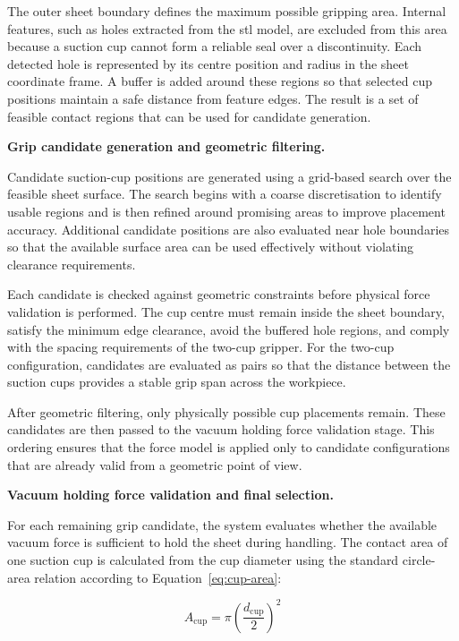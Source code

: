The outer sheet boundary defines the maximum possible gripping area. Internal features, such as holes extracted from the \ac{stl} model, are excluded from this area because a suction cup cannot form a reliable seal over a discontinuity. Each detected hole is represented by its centre position and radius in the sheet coordinate frame. A buffer is added around these regions so that selected cup positions maintain a safe distance from feature edges. The result is a set of feasible contact regions that can be used for candidate generation.

\label{subsec:grip-candidate-search}
\noindent\textbf{Grip candidate generation and geometric filtering.}

Candidate suction-cup positions are generated using a grid-based search over the feasible sheet surface. The search begins with a coarse discretisation to identify usable regions and is then refined around promising areas to improve placement accuracy. Additional candidate positions are also evaluated near hole boundaries so that the available surface area can be used effectively without violating clearance requirements.

Each candidate is checked against geometric constraints before physical force validation is performed. The cup centre must remain inside the sheet boundary, satisfy the minimum edge clearance, avoid the buffered hole regions, and comply with the spacing requirements of the two-cup gripper. For the two-cup configuration, candidates are evaluated as pairs so that the distance between the suction cups provides a stable grip span across the workpiece.

After geometric filtering, only physically possible cup placements remain. These candidates are then passed to the vacuum holding force validation stage. This ordering ensures that the force model is applied only to candidate configurations that are already valid from a geometric point of view.

\label{subsec:vacuum-force-validation}
\noindent\textbf{Vacuum holding force validation and final selection.}

For each remaining grip candidate, the system evaluates whether the available vacuum force is sufficient to hold the sheet during handling. The contact area of one suction cup is calculated from the cup diameter using the standard circle-area relation according to Equation~\ref{eq:cup-area}:

\begin{equation}
A_{\text{cup}} = \pi \left(\frac{d_{\text{cup}}}{2}\right)^2
\label{eq:cup-area}
\end{equation}

